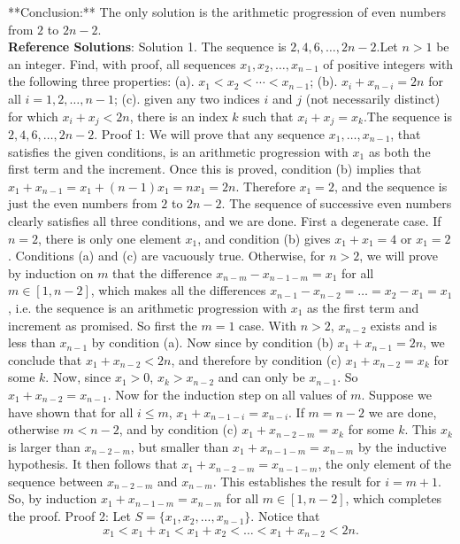 {**Conclusion:**  
The only solution is the arithmetic progression of even numbers from \( 2 \) to \( 2n-2 \). \\
    \textbf{Reference Solutions}: Solution 1. The sequence is $2, 4, 6, \ldots, 2n-2$.Let $n > 1$ be an integer. Find, with proof, all sequences
$x_1, x_2, \ldots, x_{n-1}$ of positive integers with the following
three properties:
(a). $x_1 < x_2 < \cdots < x_{n-1}$;
(b). $x_i + x_{n-i} = 2n$ for all $i=1,2,\ldots,n-1$;
(c). given any two indices $i$ and $j$ (not necessarily distinct) for which $x_i + x_j < 2n$, there is an index $k$ such that $x_i + x_j = x_k$.The sequence is $2, 4, 6, \ldots, 2n-2$.
Proof 1:
We will prove that any sequence $x_1, \ldots, x_{n-1}$, that satisfies the given conditions, is an arithmetic progression with $x_1$ as both the first term and the increment. Once this is proved, condition (b) implies that $x_1 + x_{n-1} = x_1 + (n-1)x_1 = nx_1 = 2n$. Therefore $x_1 = 2$, and the sequence is just the even numbers from $2$ to $2n-2$. The sequence of successive even numbers clearly satisfies all three conditions, and we are done.
First a degenerate case. If $n = 2$, there is only one element $x_1$, and condition (b) gives $x_1 + x_1 = 4$ or $x_1 = 2$. Conditions (a) and (c) are vacuously true.
Otherwise, for $n > 2$, we will prove by induction on $m$ that the difference $x_{n-m} - x_{n-1-m} = x_1$ for all $m \in [1, n-2]$, which makes all the differences $x_{n-1} - x_{n-2} = \ldots = x_2 - x_1 = x_1$, i.e. the sequence is an arithmetic progression with $x_1$ as the first term and increment as promised.
So first the $m=1$ case. With $n > 2$, $x_{n-2}$ exists and is less than $x_{n-1}$ by condition (a). Now since by condition (b) $x_1 + x_{n-1} = 2n$, we conclude that $x_1 + x_{n-2} < 2n$, and therefore by condition (c) $x_1 + x_{n-2} = x_k$ for some $k$.  Now, since $x_1 > 0$, $x_k > x_{n-2}$ and can only be $x_{n-1}$.  So $x_1 + x_{n-2} = x_{n-1}$.
Now for the induction step on all values of $m$. Suppose we have shown that for all $i \le m$, $x_1 + x_{n-1-i} = x_{n-i}$.  If $m = n-2$ we are done, otherwise $m < n-2$, and by condition (c) $x_1 + x_{n-2-m} = x_k$ for some $k$. This $x_k$ is larger than $x_{n-2-m}$, but smaller than $x_1 + x_{n-1-m} = x_{n-m}$ by the inductive hypothesis. It then follows that $x_1 + x_{n-2-m} = x_{n-1-m}$, the only element of the sequence between $x_{n-2-m}$ and $x_{n-m}$. This establishes the result for $i=m+1$.
So, by induction $x_1 + x_{n-1-m} = x_{n-m}$ for all $m \in [1, n-2]$, which completes the proof.
Proof 2:
Let $S=\{x_1,x_2,...,x_{n-1}\}$. Notice that \[x_1 < x_1+x_1 < x_1+x_2 < \dots < x_1+x_{n-2} < 2n.\]
}
